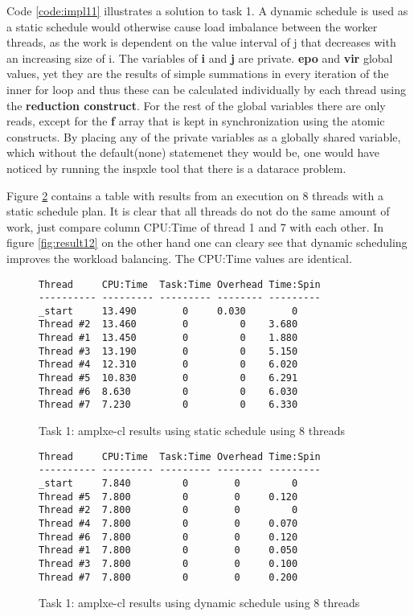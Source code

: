 \documentclass[journal]{IEEEtran}
\begin{document}
Code \ref{code:impl11} illustrates a solution to task 1. A dynamic schedule is used as a static schedule would otherwise cause load imbalance between the worker threads, as the work is dependent on the value interval of j that decreases with an increasing size of i. The variables of \textbf{i} and \textbf{j} are private. \textbf{epo} and \textbf{vir} global values, yet they are the results of simple summations in every iteration of the inner for loop and thus these can be calculated individually by each thread using the \textbf{reduction construct}. For the rest of the global variables there are only reads, except for the \textbf{f} array that is kept in synchronization using the atomic constructs. By placing any of the private variables as a globally shared variable, which without the default(none) statemenet they  would be, one would have noticed by running the inspxle tool that there is a datarace problem.

Figure \ref{fig:result11} contains a table with results from an execution on 8 threads with a static schedule plan. It is clear that all threads do not do the same amount of work, just compare column CPU:Time of thread 1 and 7 with each other. In figure \ref{fig:result12} on the other hand one can cleary see that dynamic scheduling improves the workload balancing. The CPU:Time values are identical.


\begin{figure}[here]
  \begin{lstlisting}[style=c++]
Thread     CPU:Time  Task:Time Overhead Time:Spin
---------- --------- --------- -------- ---------
_start     13.490        0     0.030        0
Thread #2  13.460        0         0    3.680
Thread #1  13.450        0         0    1.880
Thread #3  13.190        0         0    5.150
Thread #4  12.310        0         0    6.020
Thread #5  10.830        0         0    6.291
Thread #6  8.630         0         0    6.030
Thread #7  7.230         0         0    6.330
  \end{lstlisting}
  \caption{Task 1: amplxe-cl results using static schedule  using 8 threads}
  \label{fig:result11}
\end{figure}

\begin{figure}[here]
  \begin{lstlisting}[style=c++]
Thread     CPU:Time  Task:Time Overhead Time:Spin
---------- --------- --------- -------- ---------
_start     7.840         0        0         0
Thread #5  7.800         0        0     0.120
Thread #2  7.800         0        0         0
Thread #4  7.800         0        0     0.070
Thread #6  7.800         0        0     0.120
Thread #1  7.800         0        0     0.050
Thread #3  7.800         0        0     0.100
Thread #7  7.800         0        0     0.200

  \end{lstlisting}
  \caption{Task 1: amplxe-cl results using dynamic schedule using 8 threads}
  \label{fig:result11}
\end{figure}
\end{document}
